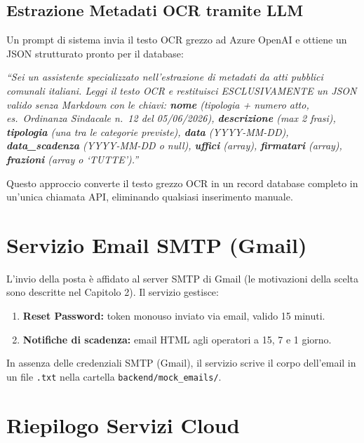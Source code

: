 \documentclass[12pt,a4paper,oneside]{report}
\begin{document}
\subsection{Estrazione Metadati OCR tramite LLM}

Un prompt di sistema invia il testo OCR grezzo ad Azure OpenAI e ottiene
un JSON strutturato pronto per il database:

\begin{promptbox}[title={System Prompt --- Estrazione Metadati OCR da LLM}]
\textit{``Sei un assistente specializzato nell'estrazione di metadati da atti pubblici comunali
italiani. Leggi il testo OCR e restituisci ESCLUSIVAMENTE un JSON valido senza Markdown con
le chiavi: \textbf{nome} (tipologia + numero atto, es.\ Ordinanza Sindacale n.\ 12 del
05/06/2026), \textbf{descrizione} (max 2 frasi), \textbf{tipologia} (una tra le categorie
previste), \textbf{data} (YYYY-MM-DD), \textbf{data\_scadenza} (YYYY-MM-DD o null),
\textbf{uffici} (array), \textbf{firmatari} (array),
\textbf{frazioni} (array o `TUTTE').''
}
\end{promptbox}

Questo approccio converte il testo grezzo OCR in un record database completo
in un'unica chiamata API, eliminando qualsiasi inserimento manuale.

\section{Servizio Email SMTP (Gmail)}

L'invio della posta \`{e} affidato al server SMTP di Gmail (le motivazioni della scelta sono
descritte nel Capitolo 2). Il servizio gestisce:
\begin{enumerate}
    \item \textbf{Reset Password:} token monouso inviato via email, valido 15 minuti.
    \item \textbf{Notifiche di scadenza:} email HTML agli operatori a 15, 7 e 1 giorno.
\end{enumerate}

\begin{notabox}[title={Modalit\`{a} locale per le email}]
In assenza delle credenziali SMTP (Gmail), il servizio scrive il corpo dell'email
in un file \texttt{.txt} nella cartella \texttt{backend/mock\_emails/}.
\end{notabox}

\section{Riepilogo Servizi Cloud}
\end{document}
